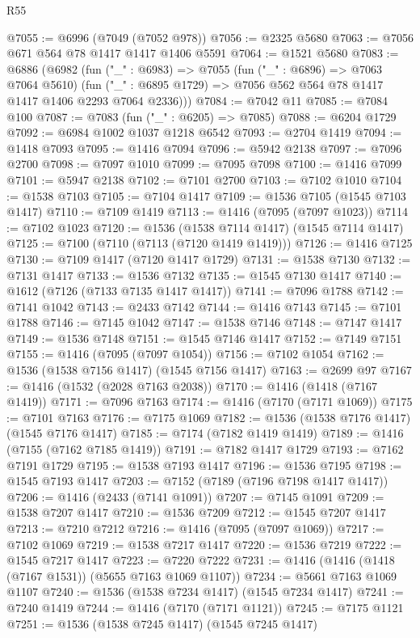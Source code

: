 \begin{lexlean}{R55}
\begin{coremodule}
{{@7055 := @6996 (@7049 (@7052 @978))
@7056 := @2325 @5680
@7063 := @7056 @671 @564 @78 @1417 @1417 @1406 @5591
@7064 := @1521 @5680
@7083 := @6886
    (@6982
      (fun ("_" : @6983) =>
      @7055
        (fun ("_" : @6896) => @7063 @7064 @5610)
        (fun ("_" : @6895 @1729) => @7056 @562 @564 @78 @1417 @1417 @1406 @2293 @7064 @2336)))
@7084 := @7042 @11
@7085 := @7084 @100
@7087 := @7083 (fun ("_" : @6205) => @7085)
@7088 := @6204 @1729
@7092 := @6984 @1002 @1037 @1218 @6542
@7093 := @2704 @1419
@7094 := @1418 @7093
@7095 := @1416 @7094
@7096 := @5942 @2138
@7097 := @7096 @2700
@7098 := @7097 @1010
@7099 := @7095 @7098
@7100 := @1416 @7099
@7101 := @5947 @2138
@7102 := @7101 @2700
@7103 := @7102 @1010
@7104 := @1538 @7103
@7105 := @7104 @1417
@7109 := @1536 @7105 (@1545 @7103 @1417)
@7110 := @7109 @1419
@7113 := @1416 (@7095 (@7097 @1023))
@7114 := @7102 @1023
@7120 := @1536 (@1538 @7114 @1417) (@1545 @7114 @1417)
@7125 := @7100 (@7110 (@7113 (@7120 @1419 @1419)))
@7126 := @1416 @7125
@7130 := @7109 @1417 (@7120 @1417 @1729)
@7131 := @1538 @7130
@7132 := @7131 @1417
@7133 := @1536 @7132
@7135 := @1545 @7130 @1417
@7140 := @1612 (@7126 (@7133 @7135 @1417 @1417))
@7141 := @7096 @1788
@7142 := @7141 @1042
@7143 := @2433 @7142
@7144 := @1416 @7143
@7145 := @7101 @1788
@7146 := @7145 @1042
@7147 := @1538 @7146
@7148 := @7147 @1417
@7149 := @1536 @7148
@7151 := @1545 @7146 @1417
@7152 := @7149 @7151
@7155 := @1416 (@7095 (@7097 @1054))
@7156 := @7102 @1054
@7162 := @1536 (@1538 @7156 @1417) (@1545 @7156 @1417)
@7163 := @2699 @97
@7167 := @1416 (@1532 (@2028 @7163 @2038))
@7170 := @1416 (@1418 (@7167 @1419))
@7171 := @7096 @7163
@7174 := @1416 (@7170 (@7171 @1069))
@7175 := @7101 @7163
@7176 := @7175 @1069
@7182 := @1536 (@1538 @7176 @1417) (@1545 @7176 @1417)
@7185 := @7174 (@7182 @1419 @1419)
@7189 := @1416 (@7155 (@7162 @7185 @1419))
@7191 := @7182 @1417 @1729
@7193 := @7162 @7191 @1729
@7195 := @1538 @7193 @1417
@7196 := @1536 @7195
@7198 := @1545 @7193 @1417
@7203 := @7152 (@7189 (@7196 @7198 @1417 @1417))
@7206 := @1416 (@2433 (@7141 @1091))
@7207 := @7145 @1091
@7209 := @1538 @7207 @1417
@7210 := @1536 @7209
@7212 := @1545 @7207 @1417
@7213 := @7210 @7212
@7216 := @1416 (@7095 (@7097 @1069))
@7217 := @7102 @1069
@7219 := @1538 @7217 @1417
@7220 := @1536 @7219
@7222 := @1545 @7217 @1417
@7223 := @7220 @7222
@7231 := @1416 (@1416 (@1418 (@7167 @1531)) (@5655 @7163 @1069 @1107))
@7234 := @5661 @7163 @1069 @1107
@7240 := @1536 (@1538 @7234 @1417) (@1545 @7234 @1417)
@7241 := @7240 @1419
@7244 := @1416 (@7170 (@7171 @1121))
@7245 := @7175 @1121
@7251 := @1536 (@1538 @7245 @1417) (@1545 @7245 @1417)
}}
\end{coremodule}
\end{lexlean}
